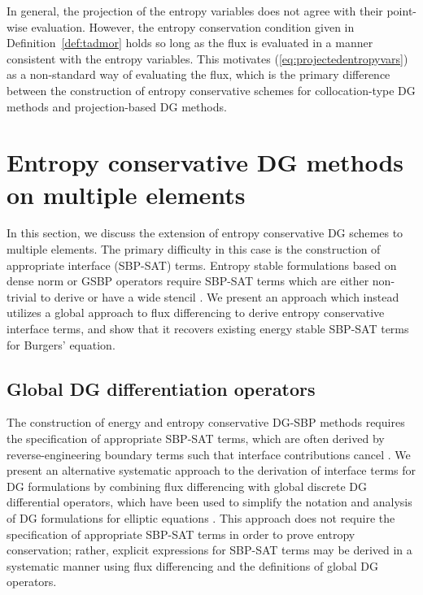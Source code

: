 \documentclass[preprint,10pt]{article}
\theoremstyle{definition}
\theoremstyle{lemma}
\theoremstyle{theorem}
\theoremstyle{assumption}
\begin{document}
In general, the projection of the entropy variables does not agree with their point-wise evaluation.  However, the entropy conservation condition given in Definition~\ref{def:tadmor} holds so long as the flux is evaluated in a manner consistent with the entropy variables.  This motivates (\ref{eq:projectedentropyvars}) as a non-standard way of evaluating the flux, which is the primary difference between the construction of entropy conservative schemes for collocation-type DG methods and projection-based DG methods.  

\section{Entropy conservative DG methods on multiple elements}
\label{sec:ecdg2}

In this section, we discuss the extension of entropy conservative DG schemes to multiple elements.  The primary difficulty in this case is the construction of appropriate interface (SBP-SAT) terms.  Entropy stable formulations based on dense norm or GSBP operators require SBP-SAT terms which are either non-trivial to derive or have a wide stencil \cite{fernandez2016simultaneous, ranocha2017extended}.  We present an approach which instead utilizes a global approach to flux differencing to derive entropy conservative interface terms, and show that it recovers existing energy stable SBP-SAT terms for Burgers' equation.  

\subsection{Global DG differentiation operators}

The construction of energy and entropy conservative DG-SBP methods requires the specification of appropriate SBP-SAT terms, which are often derived by reverse-engineering  boundary terms such that interface contributions cancel \cite{fernandez2016simultaneous, ranocha2017comparison, ranocha2017extended}.  We present an alternative systematic approach to the derivation of interface terms for DG formulations by combining flux differencing with global discrete DG differential operators, which have been used to simplify the notation and analysis of DG formulations for elliptic equations \cite{di2011mathematical, wang2013weak}.  This approach does not require the specification of appropriate SBP-SAT terms in order to prove entropy conservation; rather, explicit expressions for SBP-SAT terms may be derived in a systematic manner using flux differencing and the definitions of global DG operators.  
\end{document}
